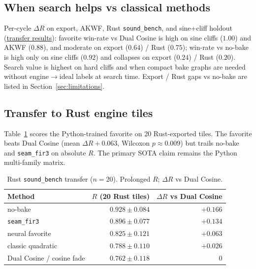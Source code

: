 \subsection{When search helps vs classical methods}
\label{sec:transfer}

Per-cycle $\Delta R$ on export, AKWF, Rust \texttt{sound\_bench}, and sine{+}cliff holdout
(\href{https://github.com/reeldemo/denoise-opt-meta/blob/master/paper/Unsupervised_Wavetable_Seam_Artifact_Repair_via_Hybrid_GA-PPO_Meta-Search_v10/figures/transfer_failures.json}{transfer results}):
favorite win-rate vs Dual Cosine is high on sine cliffs ($1.00$) and AKWF ($0.88$), and moderate on export ($0.64$) / Rust ($0.75$);
win-rate vs no-bake is high only on sine cliffs ($0.92$) and collapses on export ($0.24$) / Rust ($0.20$).
Search value is highest on hard cliffs and when compact bake graphs are needed without engine$\to$ideal labels at search time.
Export / Rust gaps vs no-bake are listed in Section~\ref{sec:limitations}.

\subsection{Transfer to Rust engine tiles}
\label{sec:rust-bench}

Table~\ref{tab:rust-bench} scores the Python-trained favorite on 20 Rust-exported tiles.
The favorite beats Dual Cosine (mean $\Delta R{+}0.063$, Wilcoxon $p{\approx}0.009$) but trails no-bake and \texttt{seam\_fir3} on absolute $R$.
The primary SOTA claim remains the Python multi-family matrix.

\begin{table}[t]
  \centering
  \caption{Rust \texttt{sound\_bench} transfer ($n{=}20$). Prolonged $R$; $\Delta R$ vs Dual Cosine.}
  \label{tab:rust-bench}
  \setlength{\tabcolsep}{3pt}
  \begin{tabular}{@{}lrr@{}}
    \toprule
    Method & $R$ (20 Rust tiles) & $\Delta R$ vs Dual Cosine \\
    \midrule
    no-bake & $0.928\pm0.084$ & ${+}0.166$ \\
    \texttt{seam\_fir3} & $0.896\pm0.077$ & ${+}0.134$ \\
    neural favorite & $0.825\pm0.121$ & ${+}0.063$ \\
    classic quadratic & $0.788\pm0.110$ & ${+}0.026$ \\
    Dual Cosine / cosine fade & $0.762\pm0.118$ & $0$ \\
    \bottomrule
  \end{tabular}
\end{table}


